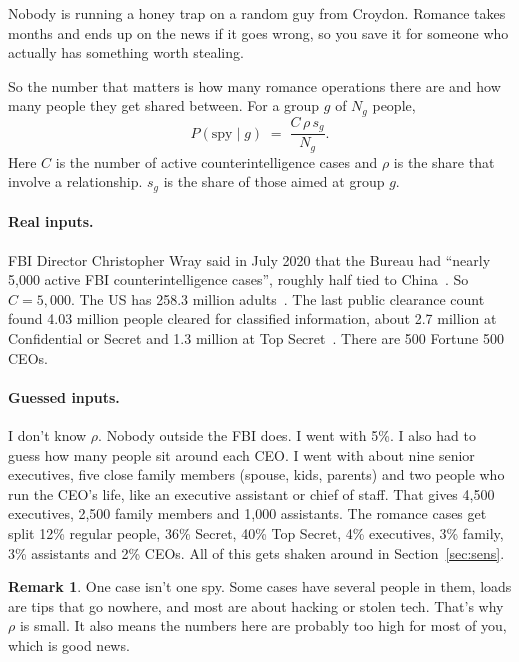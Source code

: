 \documentclass[11pt]{article}
\theoremstyle{definition}
\newtheorem{remark}[definition]{Remark}
\begin{document}
Nobody is running a honey trap on a random guy from Croydon. Romance takes months and ends up on the news if it goes wrong, so you save it for someone who actually has something worth stealing.

So the number that matters is how many romance operations there are and how many people they get shared between. For a group $g$ of $N_g$ people,
\begin{equation}
P(\text{spy} \mid g) \;=\; \frac{C \, \rho \, s_g}{N_g}.
\end{equation}
Here $C$ is the number of active counterintelligence cases and $\rho$ is the share that involve a relationship. $s_g$ is the share of those aimed at group $g$.

\paragraph{Real inputs.} FBI Director Christopher Wray said in July 2020 that the Bureau had ``nearly 5{,}000 active FBI counterintelligence cases'', roughly half tied to China~\cite{wray}. So $C = 5{,}000$. The US has 258.3 million adults~\cite{census}. The last public clearance count found 4.03 million people cleared for classified information, about 2.7 million at Confidential or Secret and 1.3 million at Top Secret~\cite{odni}. There are 500 Fortune 500 CEOs.

\paragraph{Guessed inputs.} I don't know $\rho$. Nobody outside the FBI does. I went with 5\%. I also had to guess how many people sit around each CEO. I went with about nine senior executives, five close family members (spouse, kids, parents) and two people who run the CEO's life, like an executive assistant or chief of staff. That gives 4{,}500 executives, 2{,}500 family members and 1{,}000 assistants. The romance cases get split 12\% regular people, 36\% Secret, 40\% Top Secret, 4\% executives, 3\% family, 3\% assistants and 2\% CEOs. All of this gets shaken around in Section~\ref{sec:sens}.

\begin{remark}
One case isn't one spy. Some cases have several people in them, loads are tips that go nowhere, and most are about hacking or stolen tech. That's why $\rho$ is small. It also means the numbers here are probably too high for most of you, which is good news.
\end{remark}
\end{document}

